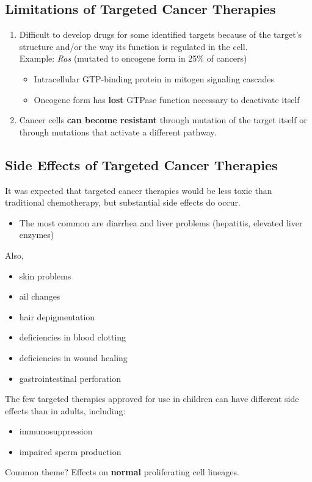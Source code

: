 \documentclass[10pt]{article}
\begin{document}
\subsection*{Limitations of Targeted Cancer Therapies}
\begin{enumerate}
	\item Difficult to develop drugs for some identified targets because of the target's structure and/or the way its function is regulated in the cell.\\
    Example: \textit{Ras} (mutated to oncogene form in 25\% of cancers)
	\begin{itemize}
        \item Intracellular GTP-binding protein in mitogen signaling cascades
        \item Oncogene form has \textbf{lost} GTPase function necessary to deactivate itself
    \end{itemize}
    \item Cancer cells \textbf{can become resistant} through mutation of the target itself or through mutations that activate a different pathway.
\end{enumerate}

\subsection*{Side Effects of Targeted Cancer Therapies}
It was expected that targeted cancer therapies would be less toxic than traditional chemotherapy, but substantial side effects do occur.
\begin{itemize}
	\item The most common are diarrhea and liver problems (hepatitis, elevated liver enzymes)
\end{itemize}
Also,
\begin{itemize}
	\item skin problems
    \item ail changes
    \item hair depigmentation
    \item deficiencies in blood clotting
    \item deficiencies in wound healing
    \item gastrointestinal perforation
\end{itemize}
The few targeted therapies approved for use in children can have different side effects than in adults, including:
\begin{itemize}
	\item immunosuppression
    \item impaired sperm production
\end{itemize}
Common theme?  Effects on \textbf{normal} proliferating cell lineages.
\end{document}
